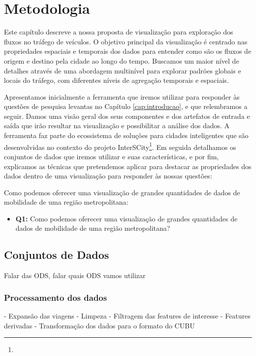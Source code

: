\chapter{Metodologia}
\label{cap:metodologia}
 Este capítulo descreve a nossa proposta de visualização para exploração dos
fluxos no tráfego de veículos. O objetivo principal da visualização é centrado
nas propriedades espaciais e temporais dos dados para entender como são os
fluxos de origem e destino pela cidade ao longo do tempo. Buscamos um maior
nível de detalhes através de uma abordagem multinível para explorar padrões
globais e locais do tráfego, com diferentes níveis de agregação temporais e
espaciais.

 Apresentamos inicialmente a ferramenta que iremos utilizar para responder às
questões de pesquisa levantas no Capítulo \ref{cap:introducao}, e que
relembramos a seguir. Damos uma visão geral dos seus componentes e dos
artefatos de entrada e saída que irão resultar na visualização e possibilitar a
análise dos dados. A ferramenta faz parte do ecossistema de soluções para
cidades inteligentes que são desenvolvidas no contexto do projeto
InterSCity\footnote{}. Em seguida detalhamos os conjuntos
de dados que iremos utilizar e suas características, e por fim, explicamos as
técnicas que pretendemos aplicar para destacar as propriedades dos dados dentro
de uma visualização para responder às nossas questões:

Como podemos oferecer uma visualização de grandes
quantidades de dados de mobilidade de uma região
metropolitana:

\begin{itemize}
  \item \textbf{Q1:} Como podemos oferecer uma visualização de grandes quantidades
de dados de mobilidade de uma região metropolitana?

\end{itemize}


\section{Conjuntos de Dados}

Falar das ODS, falar quais ODS vamos utilizar


\subsection{Processamento dos dados}

 - Expansão das viagens
 - Limpeza
 - Filtragem das features de interesse
 - Features derivadas
 - Transformação dos dados para o formato do CUBU


